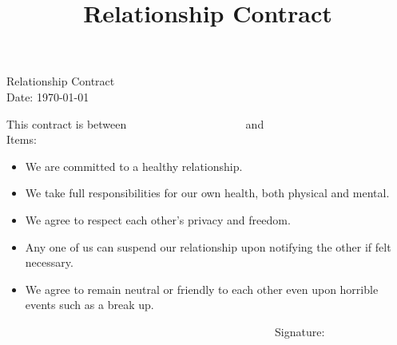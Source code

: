 \documentclass[a4paper,12pt]{article} %
\title{Relationship Contract}
\begin{document}

\begin{titlepage}

\vspace*{\fill} %

\begin{center}

{\LARGE Relationship Contract}\\ [1.5cm]

Date: \today\\[40pt]

\end{center}

This contract is between $\qquad\qquad\qquad\qquad\qquad$ and\\[20pt]

Items:

\begin{itemize}
    \item We are committed to a healthy relationship.
    \item We take full responsibilities for our own health, both physical and mental.
    \item We agree to respect each other's privacy and freedom.
    \item Any one of us can suspend our relationship upon notifying the other if felt necessary.
    \item We agree to remain neutral or friendly to each other even upon horrible events such as a break up.
\end{itemize}



\vspace*{\fill} %

$\qquad\qquad\qquad\qquad\qquad\qquad\qquad\qquad\qquad\qquad\qquad\qquad$Signature:

\end{titlepage}
\end{document}
